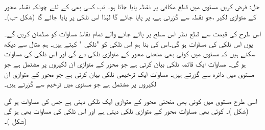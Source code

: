 حل:\quad
فرض کریں مستوی  میں  قطع مکافی  پر نقطہ  پایا جاتا ہو۔ تب کسی بھی  کے لئے  چونکہ نقطہ  محور  کے متوازی  لکیر  ،جو نقطہ  سے گزرتی ہے،    پر پایا جائے گا  لہٰذا   اس نلکی پر پایا جائے گا (شکل -ب)۔

اس طرح   کی قیمت سے قطع نظر  اس سطح پر پائے جانے والے  تمام نقاط  مساوات  کو مطمئن کریں گے۔ یوں  اس نلکی  کی مساوات ہو گی۔اس کی بنا ہم اس نلکی کو "نلکی " کہتے ہیں۔
ہم مثال  سے دیکھ سکتے ہیں کہ مستوی   میں کوئی بھی منحنی   محور  کے متوازی نلکی   دے گی  اور اس نلکی کی  مساوات   ہو گی۔ مساوات  ایک قائمہ نلکی بیان کرتی ہے جو  محور  کے متوازی  ان  لکیروں پر مشتمل ہے جو مستوی  میں دائرہ  سے گزرتے ہیں۔   مساوات  ایک ترخیمی  نلکی بیان کرتی ہے جو  محور  کے متوازی  ان  لکیروں پر مشتمل ہے جو مستوی  میں ترخیم  سے گزرتے ہیں۔ 

اسی طرح مستوی  میں کوئی بھی منحنی  محور  کے متوازی ایک نلکی دیتی ہے جس کی مساوات  ہو گی (شکل )۔ کوئی بھی مساوات   محور  کے متوازی نلکی دیتی ہے اور اس نلکی کی  مساوات بھی   ہو گی  (شکل )۔

